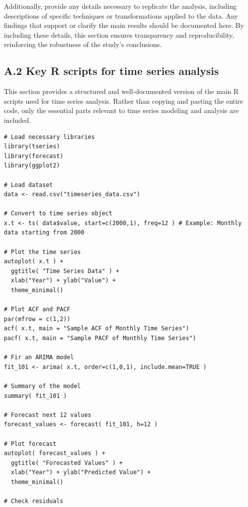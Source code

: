 \documentclass[11pt]{article}
\def\spacingset#1{\renewcommand{\baselinestretch}{#1}\small\normalsize}
\begin{document}
Additionally, provide any details necessary to replicate the analysis, including descriptions of specific techniques or transformations applied to the data. Any findings that support or clarify the main results should be documented here. By including these details, this section ensures transparency and reproducibility, reinforcing the robustness of the study's conclusions.

\subsection*{A.2 Key R scripts for time series analysis}

This section provides a structured and well-documented version of the main \textsf{R} scripts used for time series analysis. Rather than copying and pasting the entire code, only the essential parts relevant to time series modeling and analysis are included.

{\footnotesize
\begin{verbatim}
# Load necessary libraries
library(tseries)
library(forecast)
library(ggplot2)

# Load dataset
data <- read.csv("timeseries_data.csv")

# Convert to time series object
x.t <- ts( data$value, start=c(2000,1), freq=12 ) # Example: Monthly data starting from 2000

# Plot the time series
autoplot( x.t ) +
  ggtitle( "Time Series Data" ) +
  xlab("Year") + ylab("Value") +
  theme_minimal()

# Plot ACF and PACF
par(mfrow = c(1,2))
acf( x.t, main = "Sample ACF of Monthly Time Series")
pacf( x.t, main = "Sample PACF of Monthly Time Series")

# Fir an ARIMA model
fit_101 <- arima( x.t, order=c(1,0,1), include.mean=TRUE )

# Summary of the model
summary( fit_101 )

# Forecast next 12 values
forecast_values <- forecast( fit_101, h=12 )

# Plot forecast
autoplot( forecast_values ) +
  ggtitle( "Forecasted Values" ) +
  xlab("Year") + ylab("Predicted Value") +
  theme_minimal()

# Check residuals
\end{verbatim}
}

\spacingset{1.1}




\end{document}

